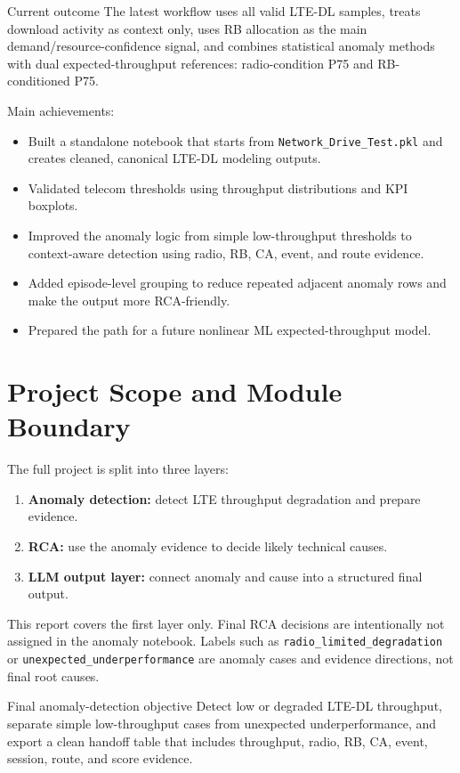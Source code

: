 \documentclass[12pt,a4paper]{article}
\newcommand{\fname}[1]{\texttt{#1}}
\begin{document}
\begin{successbox}{Current outcome}
The latest workflow uses all valid LTE-DL samples, treats download activity as context only, uses RB allocation as the main demand/resource-confidence signal, and combines statistical anomaly methods with dual expected-throughput references: radio-condition P75 and RB-conditioned P75.
\end{successbox}

Main achievements:
\begin{itemize}
    \item Built a standalone notebook that starts from \fname{Network\_Drive\_Test.pkl} and creates cleaned, canonical LTE-DL modeling outputs.
    \item Validated telecom thresholds using throughput distributions and KPI boxplots.
    \item Improved the anomaly logic from simple low-throughput thresholds to context-aware detection using radio, RB, CA, event, and route evidence.
    \item Added episode-level grouping to reduce repeated adjacent anomaly rows and make the output more RCA-friendly.
    \item Prepared the path for a future nonlinear ML expected-throughput model.
\end{itemize}

\section{Project Scope and Module Boundary}

The full project is split into three layers:
\begin{enumerate}
    \item \textbf{Anomaly detection:} detect LTE throughput degradation and prepare evidence.
    \item \textbf{RCA:} use the anomaly evidence to decide likely technical causes.
    \item \textbf{LLM output layer:} connect anomaly and cause into a structured final output.
\end{enumerate}

This report covers the first layer only. Final RCA decisions are intentionally not assigned in the anomaly notebook. Labels such as \fname{radio\_limited\_degradation} or \fname{unexpected\_underperformance} are anomaly cases and evidence directions, not final root causes.

\begin{infobox}{Final anomaly-detection objective}
Detect low or degraded LTE-DL throughput, separate simple low-throughput cases from unexpected underperformance, and export a clean handoff table that includes throughput, radio, RB, CA, event, session, route, and score evidence.
\end{infobox}
\end{document}
